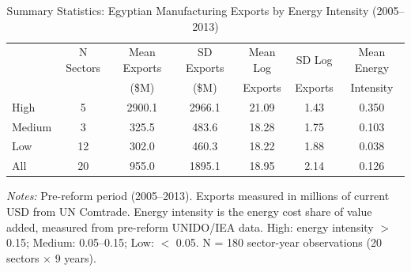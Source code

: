 \begin{table}[htbp]
\centering
\caption{Summary Statistics: Egyptian Manufacturing Exports by Energy Intensity (2005--2013)}
\label{tab:summary}
\begin{tabular}{lcccccc}
\toprule
 & N Sectors & Mean Exports & SD Exports & Mean Log & SD Log & Mean Energy \\
 & & (\$M) & (\$M) & Exports & Exports & Intensity \\
\midrule
High & 5 & 2900.1 & 2966.1 & 21.09 & 1.43 & 0.350 \\
Medium & 3 & 325.5 & 483.6 & 18.28 & 1.75 & 0.103 \\
Low & 12 & 302.0 & 460.3 & 18.22 & 1.88 & 0.038 \\
\midrule
All & 20 & 955.0 & 1895.1 & 18.95 & 2.14 & 0.126 \\
\bottomrule
\end{tabular}
\begin{tablenotes}
\small
\item \textit{Notes:} Pre-reform period (2005--2013). Exports measured in millions of current USD from UN Comtrade. Energy intensity is the energy cost share of value added, measured from pre-reform UNIDO/IEA data. High: energy intensity $>$ 0.15; Medium: 0.05--0.15; Low: $<$ 0.05. N = 180 sector-year observations (20 sectors $\times$ 9 years).
\end{tablenotes}
\end{table}

